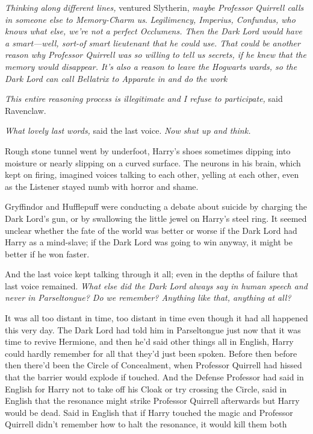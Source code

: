 \emph{Thinking along different lines,} ventured Slytherin, \emph{maybe
Professor Quirrell calls in someone else to Memory-Charm us}.
\emph{Legilimency, Imperius, Confundus, who knows what else, we're not a
perfect Occlumens. Then the Dark Lord would have a smart---well, sort-of smart
lieutenant that he could use. That could be another reason why Professor
Quirrell was so willing to tell us secrets, if he knew that the memory would
disappear. It's also a reason to leave the Hogwarts wards, so the Dark Lord can
call Bellatrix to Apparate in and do the work{\el}}

\emph{This entire reasoning process is illegitimate and I refuse to
participate,} said Ravenclaw.

\emph{What lovely last words,} said the last voice. \emph{Now shut up and
think.}

Rough stone tunnel went by underfoot, Harry's shoes sometimes dipping into
moisture or nearly slipping on a curved surface. The neurons in his brain,
which kept on firing, imagined voices talking to each other, yelling at each
other, even as the Listener stayed numb with horror and shame.

Gryffindor and Hufflepuff were conducting a debate about suicide by charging
the Dark Lord's gun, or by swallowing the little jewel on Harry's steel ring.
It seemed unclear whether the fate of the world was better or worse if the Dark
Lord had Harry as a mind-slave; if the Dark Lord was going to win anyway, it
might be better if he won faster.

And the last voice kept talking through it all; even in the depths of failure
that last voice remained. \emph{What else did the Dark Lord always say in human
speech and never in Parseltongue? Do we remember? Anything like that, anything
at all?}

It was all too distant in time, too distant in time even though it had all
happened this very day. The Dark Lord had told him in Parseltongue just now
that it was time to revive Hermione, and then he'd said other things all in
English, Harry could hardly remember for all that they'd just been spoken.
Before then{\el} before then there'd been the Circle of Concealment, when
Professor Quirrell had hissed that the barrier would explode if touched. And
the Defense Professor had said in English for Harry not to take off his Cloak
or try crossing the Circle, said in English that the resonance might strike
Professor Quirrell afterwards but Harry would be dead. Said in English that if
Harry touched the magic and Professor Quirrell didn't remember how to halt the
resonance, it would kill them both{\el}

